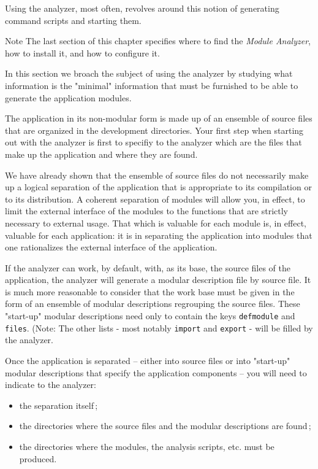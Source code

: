 Using the analyzer, most often, revolves around this notion of generating command scripts and starting them.

\begin{Side}{Note}
The last section of this chapter specifies where to find the {\em Module Analyzer}, how to install it, and how to configure it.
\end{Side}


In this section we broach the subject of using the analyzer by studying what information is the "minimal" information that must be furnished to be able to generate the application modules.

The application in its non-modular form is made up of an ensemble of source files that are organized in the development directories.  Your first step when starting out with the analyzer is first to specifiy to the analyzer which are the files that make up the application and where they are found.

We have already shown that the ensemble of source files do not necessarily make up a logical separation of the application that is appropriate to its compilation or to its distribution.
A coherent separation of modules will allow you, in effect, to limit the external interface of the modules to the functions that are strictly necessary to external usage.
That which is valuable for each module is, in effect, valuable for each application:  it is in separating the application into modules that one rationalizes the external interface of the application. 

If the analyzer can work, by default, with, as its base, the source files of the application, 
the analyzer will generate a modular description file by source file. It is much more reasonable to consider that the work base must be given in the form of an ensemble of modular descriptions regrouping the source files.  These "start-up" modular descriptions need only to contain the keys {\tt defmodule} and {\tt files}.  (Note:  The other lists - most notably {\tt import} and {\tt export} - will be filled by the analyzer.




Once the application is separated -- either into source files or  into "start-up" modular descriptions that specify the application components -- you will need to indicate to the analyzer:
\begin{itemize}
\item the separation itself\,;
\item the directories where the source files and the modular descriptions are found\,;
\item  the directories where the modules, the analysis scripts, etc. must be produced.
\end{itemize}

